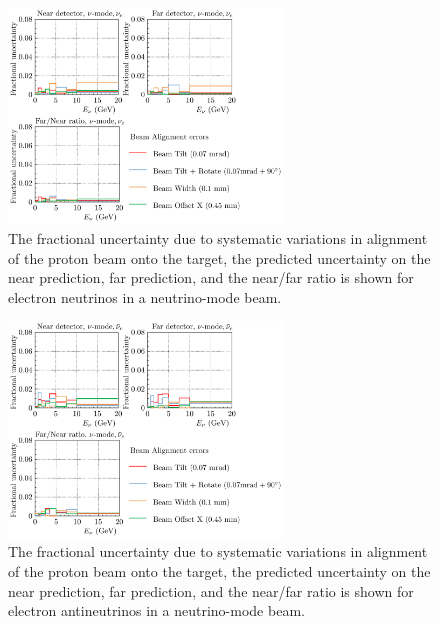 \documentclass{article}
\begin{document}
\begin{figure}
  \centering
  \includegraphics[width=0.65\textwidth]{plots/fracerrs/numode_nue_BeamAlignment}
  \caption{The fractional uncertainty due to systematic variations in alignment of the proton beam onto the target, the predicted uncertainty on the near prediction, far prediction, and the near/far ratio is shown for electron neutrinos in a neutrino-mode beam.}
  \label{fig:beamalign_nu_nue}
\end{figure}

\begin{figure}
  \centering
  \includegraphics[width=0.65\textwidth]{plots/fracerrs/numode_nuebar_BeamAlignment}
  \caption{The fractional uncertainty due to systematic variations in alignment of the proton beam onto the target, the predicted uncertainty on the near prediction, far prediction, and the near/far ratio is shown for electron antineutrinos in a neutrino-mode beam.}
  \label{fig:beamalign_nu_nuebar}
\end{figure}
\end{document}
